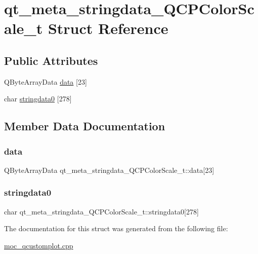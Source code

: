 \hypertarget{structqt__meta__stringdata__QCPColorScale__t}{}\section{qt\+\_\+meta\+\_\+stringdata\+\_\+\+Q\+C\+P\+Color\+Scale\+\_\+t Struct Reference}
\label{structqt__meta__stringdata__QCPColorScale__t}
\subsection*{Public Attributes}
\begin{DoxyCompactItemize}
\item 
Q\+Byte\+Array\+Data \mbox{\hyperlink{structqt__meta__stringdata__QCPColorScale__t_adbfbd7275c982d9d6c70985a35909562}{data}} \mbox{[}23\mbox{]}
\item 
char \mbox{\hyperlink{structqt__meta__stringdata__QCPColorScale__t_a0ed4cd437d62f56ea375637ec624a59c}{stringdata0}} \mbox{[}278\mbox{]}
\end{DoxyCompactItemize}


\subsection{Member Data Documentation}
\mbox{\label{structqt__meta__stringdata__QCPColorScale__t_adbfbd7275c982d9d6c70985a35909562}} 
\subsubsection{\texorpdfstring{data}{data}}
{\footnotesize\ttfamily Q\+Byte\+Array\+Data qt\+\_\+meta\+\_\+stringdata\+\_\+\+Q\+C\+P\+Color\+Scale\+\_\+t\+::data\mbox{[}23\mbox{]}}

\mbox{\label{structqt__meta__stringdata__QCPColorScale__t_a0ed4cd437d62f56ea375637ec624a59c}} 
\subsubsection{\texorpdfstring{stringdata0}{stringdata0}}
{\footnotesize\ttfamily char qt\+\_\+meta\+\_\+stringdata\+\_\+\+Q\+C\+P\+Color\+Scale\+\_\+t\+::stringdata0\mbox{[}278\mbox{]}}



The documentation for this struct was generated from the following file\+:\begin{DoxyCompactItemize}
\item 
\mbox{\hyperlink{moc__qcustomplot_8cpp}{moc\+\_\+qcustomplot.\+cpp}}\end{DoxyCompactItemize}
